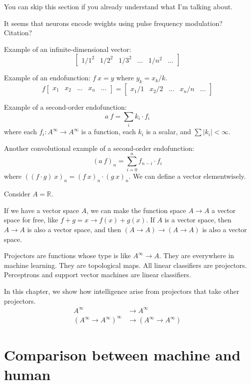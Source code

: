 You can skip this section if you already understand what I'm talking about.

It seems that neurons encode weights using pulse frequency modulation? Citation?

Example of an infinite-dimensional vector:
\[
\begin{bmatrix}
1/1^2 & 1/2^2 & 1/3^2 & \ldots & 1/n^2 & \ldots
\end{bmatrix}
\]

Example of an endofunction:
\( f~x = y \) where \( y_k = x_k / k \).
\[
    f
    \begin{bmatrix}
        x_1 & x_2 & \ldots & x_n & \ldots
    \end{bmatrix}
    =
    \begin{bmatrix}
        x_1 / 1 & x_2 / 2 & \ldots & x_n / n & \ldots
    \end{bmatrix}
\]

Example of a second-order endofunction:
\[
    a~f = \sum_i k_i \cdot f_i
\]
where each \(f_i : A^\infty \to A^\infty\) is a function,
each \(k_i\) is a scalar, and \( \sum |k_i| < \infty \).

Another convolutional example of a second-order endofunction:
\[
    (a~f)_n = \sum_{i=0}^n f_{n-i} \cdot f_i
\]
where \(((f \cdot g)~x)_n = (f~x)_n \cdot (g~x)_n\).
We can define a vector elementwisely.

Consider \(A = \mathbb{R}\).

If we have a vector space \(A\),
we can make the function space \(A \to A\) a vector space for free,
like \(f + g = x \to f(x) + g(x)\).
If \(A\) is a vector space, then \(A \to A\) is also a vector space,
and then \((A \to A) \to (A \to A)\) is also a vector space.

Projectors are functions whose type is like \(A^\infty \to A\).
They are everywhere in machine learning.
They are topological maps.
All linear classifiers are projectors.
Perceptrons and support vector machines are linear classifiers.

In this chapter, we show how intelligence arise
from projectors that take other projectors.
\begin{align*}
    A^\infty &\to A^\infty
    \\
    (A^\infty \to A^\infty)^\infty &\to (A^\infty \to A^\infty)
\end{align*}

\section{Comparison between machine and human}

